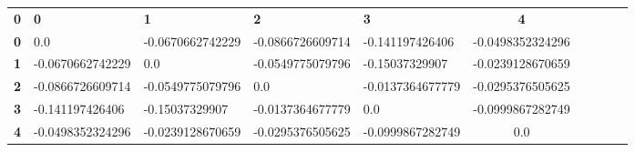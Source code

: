 \begin{center}
 \begin{tabular}{|l|l|l|l|l|c|c|c|c|c|}
\hline
\textbf{0} & \textbf{0} & \textbf{1} & \textbf{2} & \textbf{3} & \textbf{4}\\\hhline{|=|=|=|=|=|=|}
\textbf{0} & 0.0 & -0.0670662742229 & -0.0866726609714 & -0.141197426406 & -0.0498352324296\\
\textbf{1} & -0.0670662742229 & 0.0 & -0.0549775079796 & -0.15037329907 & -0.0239128670659\\
\textbf{2} & -0.0866726609714 & -0.0549775079796 & 0.0 & -0.0137364677779 & -0.0295376505625\\
\textbf{3} & -0.141197426406 & -0.15037329907 & -0.0137364677779 & 0.0 & -0.0999867282749\\
\textbf{4} & -0.0498352324296 & -0.0239128670659 & -0.0295376505625 & -0.0999867282749 & 0.0\\
\hline
\end{tabular}
\end{center}